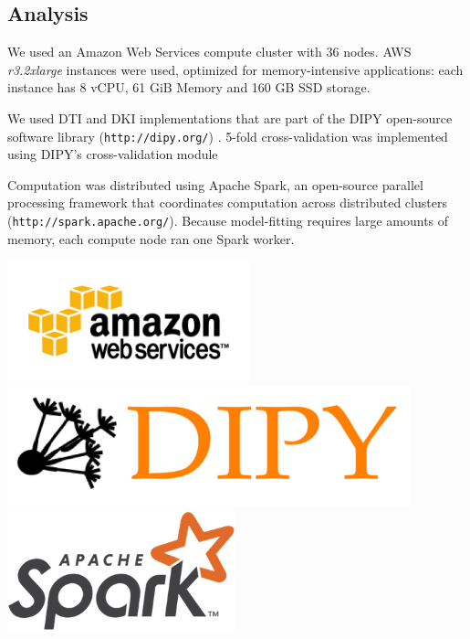 \documentclass[a0, landscape]{a0poster}
\begin{document}
\begin{multicols}{3}
\color{DarkSlateGray}
\subsection*{Analysis}

We used an Amazon Web Services compute cluster with 36 nodes. AWS
\emph{r3.2xlarge} instances were used, optimized for memory-intensive
applications: each instance has 8 vCPU, 61 GiB Memory and 160 GB SSD storage.

\noindent We used DTI and DKI implementations that are part of the DIPY
open-source software library (\texttt{http://dipy.org/}) \cite{Garyfallidis2014FrontNeuroinf}. 5-fold cross-validation was implemented using DIPY's cross-validation module \cite{Rokem2015PLoS}

\noindent Computation was distributed using Apache Spark, an open-source
parallel processing framework that coordinates computation across distributed
clusters (\texttt{http://spark.apache.org/}). Because model-fitting requires
large amounts of memory, each compute node ran one Spark worker.

\hspace{2 mm}
\includegraphics[height=3.5cm]{AWS.png}
\hspace{2 mm}
\includegraphics[height=3.5cm]{dipy-logo.png}
\hspace{2 mm}
\includegraphics[height=3.5cm]{spark-logo.png}
\hspace{2 mm}


\end{multicols}
\end{document}
